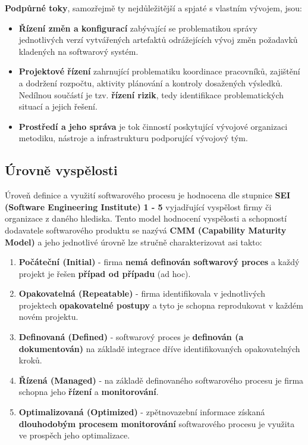 \pagebreak
\noindent\textbf{Podpůrné toky}, samozřejmě ty nejdůležitější a spjaté s vlastním vývojem, jsou:
\begin{itemize}
\item \textbf{Řízení změn a konfigurací} zabývající se problematikou správy jednotlivých verzí vytvářených artefaktů odrážejících vývoj změn požadavků kladených na softwarový systém.
\item \textbf{Projektové řízení} zahrnující problematiku koordinace pracovníků, zajištění a dodržení rozpočtu, aktivity plánování a kontroly dosažených výsledků.  Nedílnou součástí je tzv. \textbf{řízení rizik}, tedy identifikace problematických situací a jejich řešení.
\item \textbf{Prostředí a jeho správa} je tok činností poskytující vývojové organizaci metodiku, nástroje a infrastrukturu podporující vývojový tým.
\end{itemize}

\subsection{Úrovně vyspělosti}
Úroveň definice a využití softwarového procesu je hodnocena dle stupnice \textbf{SEI (Software Engineering Institute)} \textbf{1 - 5} vyjadřující vyspělost firmy či organizace z daného hlediska. Tento model hodnocení vyspělosti a schopností dodavatele softwarového produktu se nazývá \textbf{CMM (Capability Maturity Model)} a jeho jednotlivé úrovně lze stručně charakterizovat asi takto:

\begin{enumerate}
	\item \textbf{Počáteční (Initial)} - firma \textbf{nemá definován softwarový proces} a každý projekt je řešen \textbf{případ od případu} (ad hoc).
	\item \textbf{Opakovatelná (Repeatable)} - firma identifikovala v jednotlivých projektech \textbf{opakovatelné postupy} a tyto je schopna reprodukovat v každém novém projektu.
	\item \textbf{Definovaná (Defined)} - softwarový proces je \textbf{definován (a dokumentován)} na základě integrace dříve identifikovaných opakovatelných kroků.
	\item \textbf{Řízená (Managed)} - na základě definovaného softwarového procesu je firma schopna jeho \textbf{řízení} a \textbf{monitorování}.
	\item \textbf{Optimalizovaná (Optimized)} - zpětnovazební informace získaná \textbf{dlouhodobým procesem monitorování} softwarového procesu je využita ve prospěch jeho optimalizace.
\end{enumerate}

